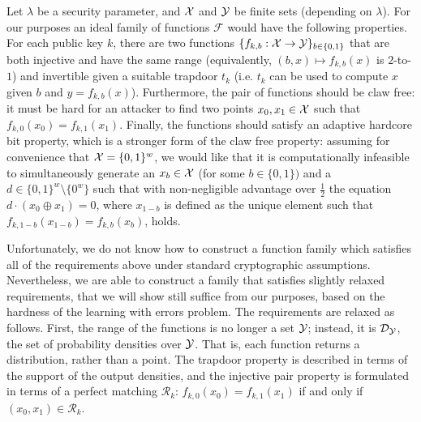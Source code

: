 
Let $\lambda$ be a security parameter, and $\mathcal{X}$ and $\mathcal{Y}$ be finite sets (depending on $\lambda$). For our purposes an ideal family of functions $\mathcal{F}$ would have the following properties. For each public key $k$, there are two functions $ \{f_{k,b}:\mathcal{X}\rightarrow \mathcal{Y}\}_{b\in\{0,1\}}$ that are both injective and have the same range (equivalently, $(b,x)\mapsto f_{k,b}(x)$ is $2$-to-$1$) and invertible given a suitable trapdoor $t_k$ (i.e. $t_k$ can be used to compute $x$ given $b$ and $y=f_{k,b}(x)$). Furthermore, the pair of functions should be claw free: it must be hard for an attacker to find two points $x_0,x_1\in\mathcal{X}$ such that $f_{k,0}(x_0) = f_{k,1}(x_1)$. Finally, the functions should satisfy an adaptive hardcore bit property, which is a stronger form of the claw free property: assuming for convenience that $\mathcal{X}= \{0,1\}^w$, we would like that it is computationally infeasible to simultaneously generate an $x_b\in\mathcal{X}$ (for some $b\in\{0,1\})$ and a $d\in \{0,1\}^w\setminus \{0^w\}$ such that with non-negligible advantage over $\frac{1}{2}$ the equation $d\cdot (x_0\oplus x_1)=0$, where $x_{1-b}$ is defined as the unique element such that $f_{k,1-b}(x_{1-b})=f_{k,b}(x_b)$, holds.  


Unfortunately, we do not know how to construct a function family which satisfies all of the requirements above under standard cryptographic assumptions. Nevertheless, we are able to construct a family that satisfies slightly relaxed requirements, that we will show still suffice from our purposes, based on the hardness of the learning with errors problem. The requirements are relaxed as follows. First, the range of the functions is no longer a set $\mathcal{Y}$; instead, it is  $\mathcal{D}_{\mathcal{Y}}$, the set of probability densities over $\mathcal{Y}$. That is, each function returns a distribution, rather than a point. The trapdoor property is described in terms of the support of the output densities, and the injective pair property is formulated in terms of a perfect matching $\mathcal{R}_k$: $f_{k,0}(x_0) = f_{k,1}(x_1)$ if and only if $(x_0,x_1)\in\mathcal{R}_k$. 

